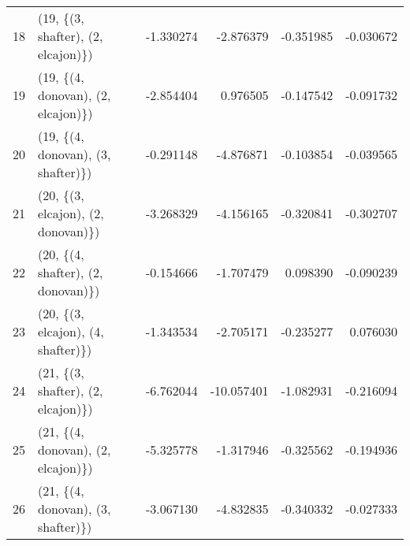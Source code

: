 \begin{tabular}{llrrrr}
18 &  (19, \{(3, shafter), (2, elcajon)\}) & -1.330274 &  -2.876379 &  -0.351985 & -0.030672 \\
19 &  (19, \{(4, donovan), (2, elcajon)\}) & -2.854404 &   0.976505 &  -0.147542 & -0.091732 \\
20 &  (19, \{(4, donovan), (3, shafter)\}) & -0.291148 &  -4.876871 &  -0.103854 & -0.039565 \\
21 &  (20, \{(3, elcajon), (2, donovan)\}) & -3.268329 &  -4.156165 &  -0.320841 & -0.302707 \\
22 &  (20, \{(4, shafter), (2, donovan)\}) & -0.154666 &  -1.707479 &   0.098390 & -0.090239 \\
23 &  (20, \{(3, elcajon), (4, shafter)\}) & -1.343534 &  -2.705171 &  -0.235277 &  0.076030 \\
24 &  (21, \{(3, shafter), (2, elcajon)\}) & -6.762044 & -10.057401 &  -1.082931 & -0.216094 \\
25 &  (21, \{(4, donovan), (2, elcajon)\}) & -5.325778 &  -1.317946 &  -0.325562 & -0.194936 \\
26 &  (21, \{(4, donovan), (3, shafter)\}) & -3.067130 &  -4.832835 &  -0.340332 & -0.027333 \\
\bottomrule
\end{tabular}
